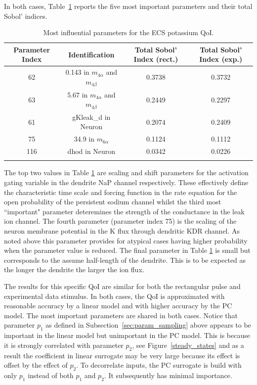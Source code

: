 In both cases, Table~\ref{tab:K_ECS_Mean} reports the five most important parameters and their total Sobol' indices. 


\begin{table}[h]
\centering
{}
\begin{tabular}{cccc}
\toprule
Parameter Index & Identification & Total Sobol' Index (rect.) & Total Sobol' Index (exp.)\\
\midrule
62 & 0.143 in $m_{4\alpha}$ and $m_{4 \beta}$ &  0.3738 & 0.3732\\
63 & 5.67 in $m_{4\alpha}$ and $m_{4 \beta}$  &  0.2449 & 0.2297\\
61 & gKleak\_d in Neuron &0.2074 & 0.2409\\
75 & 34.9 in $m_{6 \alpha}$ & 0.1124 & 0.1112\\
116 & dhod in Neuron & 0.0342 & 0.0226\\
 \arrayrulecolor{black}\bottomrule
\end{tabular}
\caption{Most influential parameters for the ECS potassium QoI.}
\label{tab:K_ECS_Mean}
\end{table}

The top two values in Table \ref{tab:K_ECS_Mean} are scaling and shift parameters for the activation gating variable in the dendrite NaP channel respectively. These effectively define the characteristic time scale and forcing function in the rate equation for the open  probability of the persistent sodium channel whilst the third most ``important" parameter deteremines the strength of the  conductance in the \pot leak ion channel. The fourth parameter (parameter index 75) is the scaling of the neuron membrane potential in the K flux through dendritic KDR channel. As noted above this parameter provides for atypical cases having higher probability when the parameter value is reduced. The final parameter in Table \ref{tab:K_ECS_Mean} is small but corresponds to the assume half-length of the dendrite. This is to be expected as the longer the dendrite the larger the ion flux. 

The results for this specific QoI are similar for both the rectangular pulse and experimental data stimulus. In both cases, the QoI is approximated with reasonable accuracy by a linear model and with higher accuracy by the PC model. The most important parameters are shared in both cases. Notice that parameter $p_1$ as defined in Subsection~\ref{sec:param_sampling} above appears to be important in the linear model but unimportant in the PC model. This is because it is strongly correlated with parameter $p_2$, see Figure~\ref{steady_states}  and as a result the coefficient in linear surrogate may be very large because its effect is offset by the effect of $p_2$. To decorrelate inputs, the PC surrogate is build with only $p_1$ instead of both $p_1$ and $p_2$. It subsequently has minimal importance.

